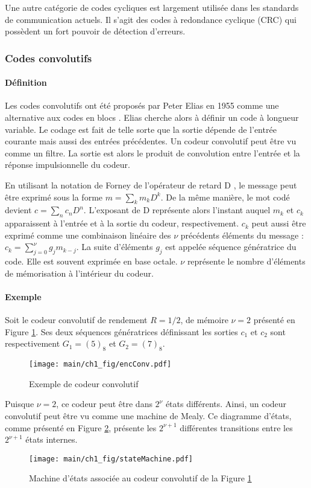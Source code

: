 Une autre catégorie de codes cycliques est largement utilisée dans les standards de communication actuels. Il s'agit des 
codes à redondance cyclique (CRC) \cite{crc} qui possèdent un fort pouvoir de détection d'erreurs.

\subsubsection{Codes convolutifs}
\paragraph*{Définition}
Les codes convolutifs ont été proposés par Peter Elias en 1955 comme une alternative aux codes en blocs \cite{elias}. 
Elias cherche alors à définir un code à longueur variable. Le codage est fait de telle sorte que la sortie dépende de 
l'entrée courante mais aussi des entrées précédentes. Un codeur convolutif peut être vu comme un filtre. La sortie 
est alors le produit de convolution entre l'entrée et la réponse impulsionnelle du codeur. 

En utilisant la notation de Forney de l'opérateur de retard D \cite{forney1970convolutional}, le message peut être exprimé 
sous la forme $m=\sum_k m_kD^k$. De la même manière, le mot codé devient $c=\sum_n c_nD^n$. L'exposant de D représente 
alors l'instant auquel $m_k$ et $c_k$ apparaissent à l'entrée et à la sortie du codeur, respectivement. $c_k$ peut aussi 
être exprimé comme une combinaison linéaire des $\nu$ précédents éléments du message : $c_k = \sum\limits_{j=0}^\nu g_jm_{k-j}$.
La suite d'éléments $g_j$ est appelée séquence génératrice du code. Elle est souvent exprimée en base octale. $\nu$ représente le 
nombre d'éléments de mémorisation à l'intérieur du codeur.

\paragraph*{Exemple}
Soit le codeur convolutif de rendement $R=1/2$, de mémoire $\nu = 2$ présenté en Figure \ref{fig:encConv}. Ses deux 
séquences génératrices définissant les sorties $c_1$ et $c_2$ sont respectivement $G_1 = (5)_8$ et $G_2 = (7)_8$.
\begin{figure}[!h]
	\centering
	\texttt{[image: main/ch1\_fig/encConv.pdf]}
	\caption{\label{fig:encConv} Exemple de codeur convolutif}
\end{figure}
Puisque $\nu = 2$, ce codeur peut être dans $2^\nu$ états différents. Ainsi, un codeur convolutif peut être vu comme une 
machine de Mealy. Ce diagramme d'états, comme présenté en Figure \ref{fig:stateMachine}, présente les  $2^{\nu+1}$ 
différentes transitions entre les $2^{\nu+1}$ états internes. 
\begin{figure}[!h]
	\centering
	\texttt{[image: main/ch1\_fig/stateMachine.pdf]}
	\caption{\label{fig:stateMachine} Machine d'états associée au codeur convolutif de la Figure \ref{fig:encConv}}
\end{figure}

